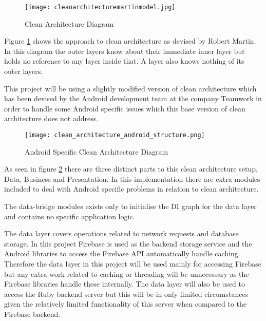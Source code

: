 \begin{figure}[ht]
  \centering
      \texttt{[image: cleanarchitecturemartinmodel.jpg]}
  \caption[Clean Architecture Diagram]{Clean Architecture Diagram\cite{cleanarchitecturemartindiagram}}
  \label{fig:cleanarchitecturediagram}
\end{figure}

Figure \ref{fig:cleanarchitecturediagram} shows the approach to clean architecture as devised by Robert Martin. In this diagram the outer layers know about their immediate inner layer but holds no reference to any layer inside that. A layer also knows nothing of its outer layers.

This project will be using a slightly modified version of clean architecture which has been devised by the Android development team at the company Teamwork in order to handle some Android specific issues which this base version of clean architecture does not address.

\begin{figure}[ht]
  \centering
      \texttt{[image: clean\_architecture\_android\_structure.png]}
  \caption[Android Specific Clean Architecture Diagram]{Android Specific Clean Architecture Diagram\cite{teamworkcleanarchitecture}}
  \label{fig:teamworkcleanarchitecture}
\end{figure}

As seen in figure \ref{fig:teamworkcleanarchitecture} there are three distinct parts to this clean architecture setup, Data, Business and Presentation. In this implementation there are extra modules included to deal with Android specific problems in relation to clean architecture.

The data-bridge modules exists only to initialise the DI graph for the data layer and contains no specific application logic.

The data layer covers operations related to network requests and database storage. In this project Firebase is used as the backend storage service and the Android libraries to access the Firebase API automatically handle caching. Therefore the data layer in this project will be used mainly for accessing Firebase but any extra work related to caching or threading will be unnecessary as the Firebase libraries handle these internally. The data layer will also be used to access the Ruby backend server but this will be in only limited circumstances given the relatively limited functionality of this server when compared to the Firebase backend.

